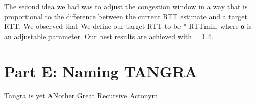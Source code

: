 \documentclass[12pt]{article}
\begin{document}
The second idea we had was to adjust the congestion window in a way that is
proportional to the difference between the current RTT estimate and a target
RTT. We observed that We define our target RTT to be * RTTmin, where α is an
adjustable parameter. Our best results are achieved with = 1.4.

\section*{Part E: Naming TANGRA}

Tangra is yet
ANother
Great
Recursive
Acronym
\end{document}
